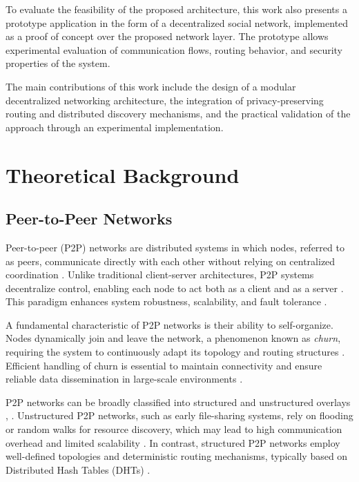 \documentclass[
  12pt,
  oneside,
  a4paper,
  chapter=TITLE,
  section=TITLE,
  english,
  brazil
]{abntex2}
\begin{document}
To evaluate the feasibility of the proposed architecture, this work also presents a prototype application in the form of a decentralized social network, implemented as a proof of concept over the proposed network layer. The prototype allows experimental evaluation of communication flows, routing behavior, and security properties of the system.

The main contributions of this work include the design of a modular decentralized networking architecture, the integration of privacy-preserving routing and distributed discovery mechanisms, and the practical validation of the approach through an experimental implementation.







\chapter{Theoretical Background}

\section{Peer-to-Peer Networks}

Peer-to-peer (P2P) networks are distributed systems in which nodes, referred to as peers, communicate directly with each other without relying on centralized coordination \cite{augustine2022byzantine}. Unlike traditional client-server architectures, P2P systems decentralize control, enabling each node to act both as a client and as a server \cite{augustine2022byzantine}. This paradigm enhances system robustness, scalability, and fault tolerance \cite{augustine2022byzantine}.

A fundamental characteristic of P2P networks is their ability to self-organize. Nodes dynamically join and leave the network, a phenomenon known as \textit{churn}, requiring the system to continuously adapt its topology and routing structures \cite{augustine2022byzantine}. Efficient handling of churn is essential to maintain connectivity and ensure reliable data dissemination in large-scale environments \cite{augustine2022byzantine}.

P2P networks can be broadly classified into structured and unstructured overlays \cite{mehr2019unstructured}, \cite{augustine2022byzantine}. Unstructured P2P networks, such as early file-sharing systems, rely on flooding or random walks for resource discovery, which may lead to high communication overhead and limited scalability \cite{mehr2019unstructured}. In contrast, structured P2P networks employ well-defined topologies and deterministic routing mechanisms, typically based on Distributed Hash Tables (DHTs) \cite{augustine2022byzantine}.
\end{document}
